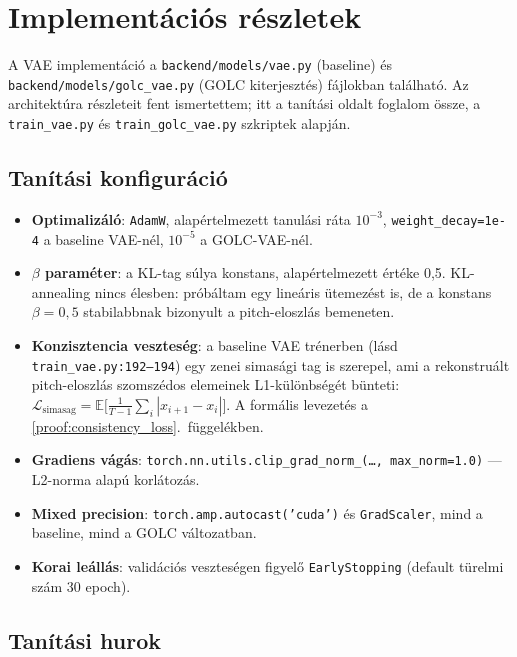 \section{Implementációs részletek}
\label{sec:vae_impl}

A VAE implementáció a \texttt{backend/models/vae.py} (baseline) és \texttt{backend/models/golc\_vae.py} (GOLC kiterjesztés) fájlokban található. Az architektúra részleteit fent ismertettem; itt a tanítási oldalt foglalom össze, a \texttt{train\_vae.py} és \texttt{train\_golc\_vae.py} szkriptek alapján.

\subsection{Tanítási konfiguráció}

\begin{itemize}
\item \textbf{Optimalizáló}: \texttt{AdamW}, alapértelmezett tanulási ráta $10^{-3}$, \texttt{weight\_decay=1e-4} a baseline VAE-nél, $10^{-5}$ a GOLC-VAE-nél.
\item \textbf{$\beta$ paraméter}: a KL-tag súlya konstans, alapértelmezett értéke 0,5. KL-annealing nincs élesben: próbáltam egy lineáris ütemezést is, de a konstans $\beta = 0{,}5$ stabilabbnak bizonyult a pitch-eloszlás bemeneten.
\item \textbf{Konzisztencia veszteség}: a baseline VAE trénerben (lásd \texttt{train\_vae.py:192--194}) egy zenei simasági tag is szerepel, ami a rekonstruált pitch-eloszlás szomszédos elemeinek L1-különbségét bünteti: $\mathcal{L}_{\text{simasag}} = \mathbb{E}\bigl[\frac{1}{T-1}\sum_i |x_{i+1} - x_i|\bigr]$. A formális levezetés a \ref{proof:consistency_loss}.\ függelékben.
\item \textbf{Gradiens vágás}: \texttt{torch.nn.utils.clip\_grad\_norm\_(\ldots, max\_norm=1.0)} --- L2-norma alapú korlátozás.
\item \textbf{Mixed precision}: \texttt{torch.amp.autocast('cuda')} és \texttt{GradScaler}, mind a baseline, mind a GOLC változatban.
\item \textbf{Korai leállás}: validációs veszteségen figyelő \texttt{EarlyStopping} (default türelmi szám 30 epoch).
\end{itemize}

\subsection{Tanítási hurok}

